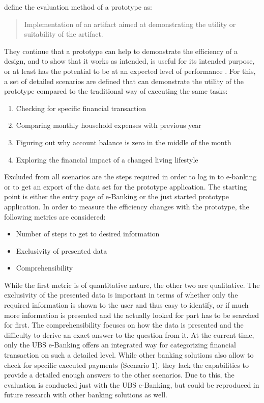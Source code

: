 \citet[p.4]{Peffers2012} define the evaluation method of a prototype as: \blockquote{Implementation of an artifact aimed at demonstrating the utility or suitability of the artifact.} They continue that a prototype can help to demonstrate the efficiency of a design, and to show that it works as intended, is useful for its intended purpose, or at least has the potential to be at an expected level of performance \citep{Peffers2012}. For this, a set of detailed scenarios are defined that can demonstrate the utility of the prototype compared to the traditional way of executing the same tasks:
\begin{enumerate}
	\item Checking for specific financial transaction
	\item Comparing monthly household expenses with previous year
	\item Figuring out why  account balance is zero in the middle of the month
	\item Exploring the financial impact of a changed living lifestyle
\end{enumerate}
Excluded from all scenarios are the steps required in order to log in to e-banking or to get an export of the data set for the prototype application. The starting point is either the entry page of e-Banking or the just started prototype application. In order to measure the efficiency changes with the prototype, the following metrics are considered:
\begin{itemize}[noitemsep,nolistsep]
	\item Number of steps to get to desired information
	\item Exclusivity of presented data
	\item Comprehensibility
\end{itemize}
While the first metric is of quantitative nature, the other two are qualitative. The exclusivity of the presented data is important in terms of whether only the required information is shown to the user and thus easy to identify, or if much more information is presented and the actually looked for part has to be searched for first. The comprehensibility focuses on how the data is presented and the difficulty to derive an exact answer to the question from it. \newline
At the current time, only the UBS e-Banking offers an integrated way for categorizing financial transaction on such a detailed level. While other banking solutions also allow to check for specific executed payments (Scenario 1), they lack the capabilities to provide a detailed enough answers to the other scenarios. Due to this, the evaluation is conducted just with the UBS e-Banking, but could be reproduced in future research with other banking solutions as well.


